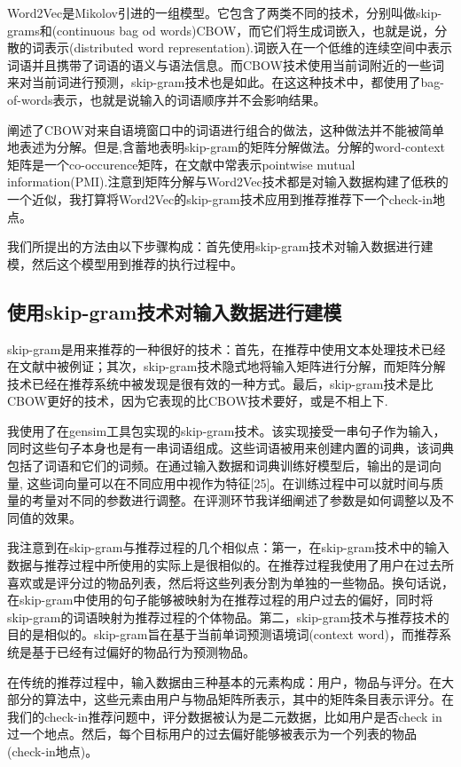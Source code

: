 \documentclass[UTF8]{ctexart}
\begin{document}
	Word2Vec是Mikolov\cite{mikolov2013distributed,mikolov2013efficient}引进的一组模型。它包含了两类不同的技术，分别叫做skip-grams和(continuous bag od words)CBOW，而它们将生成词嵌入，也就是说，分散的词表示(distributed word representation).词嵌入在一个低维的连续空间中表示词语并且携带了词语的语义与语法信息\cite{li2015word}。而CBOW技术使用当前词附近的一些词来对当前词进行预测，skip-gram技术也是如此。在这这种技术中，都使用了bag-of-words表示，也就是说输入的词语顺序并不会影响结果。
	
	\cite{levy2015improving}阐述了CBOW对来自语境窗口中的词语进行组合的做法，这种做法并不能被简单地表述为分解。但是,\cite{levy2014neural}含蓄地表明skip-gram的矩阵分解做法。分解的word-context矩阵是一个co-occurence矩阵，在文献中常表示pointwise mutual information(PMI).注意到矩阵分解与Word2Vec技术都是对输入数据构建了低秩的一个近似，我打算将Word2Vec的skip-gram技术应用到推荐推荐下一个check-in地点。
	
	我们所提出的方法由以下步骤构成：首先使用skip-gram技术对输入数据进行建模，然后这个模型用到推荐的执行过程中。
	
	\subsection{使用skip-gram技术对输入数据进行建模}
	skip-gram是用来推荐的一种很好的技术：首先，在推荐中使用文本处理技术已经在文献中被例证；其次，skip-gram技术隐式地将输入矩阵进行分解，而矩阵分解技术已经在推荐系统中被发现是很有效的一种方式。最后，skip-gram技术是比CBOW更好的技术，因为它表现的比CBOW技术要好，或是不相上下\cite{mikolov2013distributed,levy2014neural}.
	
	我使用了在gensim工具包实现的skip-gram技术。该实现接受一串句子作为输入，同时这些句子本身也是有一串词语组成。这些词语被用来创建内置的词典，该词典包括了词语和它们的词频。在通过输入数据和词典训练好模型后，输出的是词向量, 这些词向量可以在不同应用中视作为特征[25]。在训练过程中可以就时间与质量的考量对不同的参数进行调整。在评测环节我详细阐述了参数是如何调整以及不同值的效果。
	
	我注意到在skip-gram与推荐过程的几个相似点：第一，在skip-gram技术中的输入数据与推荐过程中所使用的实际上是很相似的。在推荐过程我使用了用户在过去所喜欢或是评分过的物品列表，然后将这些列表分割为单独的一些物品。换句话说，在skip-gram中使用的句子能够被映射为在推荐过程的用户过去的偏好，同时将skip-gram的词语映射为推荐过程的个体物品。第二，skip-gram技术与推荐技术的目的是相似的。skip-gram旨在基于当前单词预测语境词(context word)，而推荐系统是基于已经有过偏好的物品行为预测物品。
	
	在传统的推荐过程中，输入数据由三种基本的元素构成：用户，物品与评分。在大部分的算法中，这些元素由用户与物品矩阵所表示，其中的矩阵条目表示评分。在我们的check-in推荐问题中，评分数据被认为是二元数据，比如用户是否check in过一个地点。然后，每个目标用户的过去偏好能够被表示为一个列表的物品(check-in地点)。
	
\end{document}
